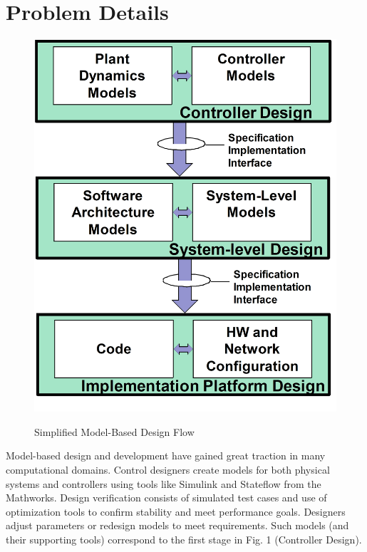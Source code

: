 \section{Problem Details}
\label{problemdetails} 

\begin{figure}[ht]
		\includegraphics[scale=.4]{figures/design_diagram.png}
		\centering
	  \label{fig:design_diagram}
		\caption{Simplified Model-Based Design Flow}
\end{figure}

Model-based design and development have gained great traction in many computational domains.  Control designers create models for both physical systems and controllers using tools like Simulink and Stateflow from the Mathworks\cite{tools:mathworks}.  Design verification consists of simulated test cases and use of optimization tools to confirm stability and meet performance goals. Designers adjust parameters or redesign models to meet requirements.  Such models (and their supporting tools) correspond to the first stage in Fig. 1 (Controller Design). 

